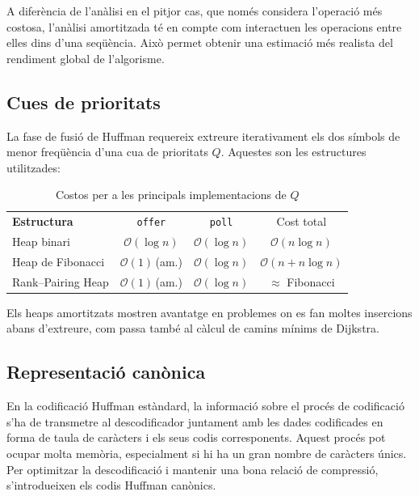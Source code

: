 \documentclass{ieeetj}
\begin{document}
A diferència de l'anàlisi en el pitjor cas, que només considera l'operació més costosa, l'anàlisi amortitzada té en compte com interactuen les operacions entre elles dins d'una seqüència. Això permet obtenir una estimació més realista del rendiment global de l'algorisme.
\subsection{Cues de prioritats}\label{subsec:heaps}
La fase de fusió de Huffman requereix extreure iterativament els dos símbols
de menor freqüència d’una cua de prioritats $Q$. Aquestes son les estructures utilitzades:

\begin{table}[h!]
\centering
\caption{Costos per a les principals implementacions de $Q$}
\label{tab:heaps}
\begin{tabular}{lccc}
\toprule
\textbf{Estructura}           & \texttt{offer} & \texttt{poll} & Cost total \\
Heap binari                   & $\mathcal{O}(\log n)$ & $\mathcal{O}(\log n)$ & $\mathcal{O}(n\log n)$ \\
Heap de Fibonacci             & $\mathcal{O}(1)$\,(am.) & $\mathcal{O}(\log n)$ & $\mathcal{O}(n+n\log n)$ \\
Rank–Pairing Heap             & $\mathcal{O}(1)$\,(am.) & $\mathcal{O}(\log n)$ & $\approx$ Fibonacci \\
\end{tabular}
\end{table}

Els heaps amortitzats mostren avantatge en problemes on es fan moltes
insercions abans d’extreure, com passa també al càlcul de camins mínims de
Dijkstra.
\subsection{Representació canònica} 

En la codificació Huffman estàndard, la informació sobre el procés de codificació s'ha de transmetre al descodificador juntament amb les dades codificades en forma de taula de caràcters i els seus codis corresponents. Aquest procés pot ocupar molta memòria, especialment si hi ha un gran nombre de caràcters únics. Per optimitzar la descodificació i mantenir una bona relació de compressió, s'introdueixen els codis Huffman canònics.\newline
\end{document}
